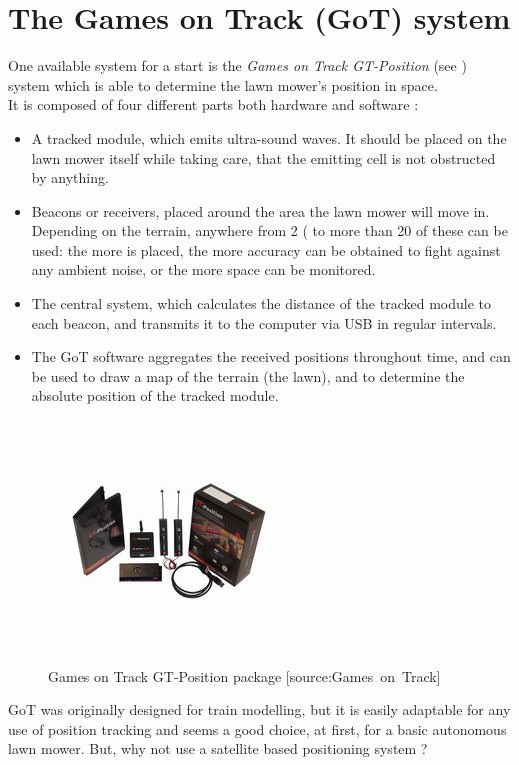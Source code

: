 \section{The Games on Track (GoT) system}
One available system for a start is the \emph{Games on Track GT-Position} (see ) system which is able to determine the lawn mower's position in space.\\
%
It is composed of four different parts both hardware and software \cite{GOTWebsitePos} :
\begin{itemize}
	\item A tracked module, which emits ultra-sound waves. It should be placed on the lawn mower itself while taking care, that the emitting cell is not obstructed by anything.
	\item Beacons or receivers, placed around the area the lawn mower will move in. Depending on the terrain, anywhere from 2 ( to more than 20 of these can be used: the more is placed, the more accuracy can be obtained to fight against any ambient noise, or the more space can be monitored.
	\item The central system, which calculates the distance of the tracked module to each beacon, and transmits it to the computer via USB in regular intervals.
	\item The GoT software aggregates the received positions throughout time, and can be used to draw a map of the terrain (the lawn), and to determine the absolute position of the tracked module.
\end{itemize}

\begin{figure}[H]
\centering
\includegraphics[scale=1.1]{figures/gotSystem.jpg} 
\caption{Games on Track GT-Position package [source:Games\ on\ Track]}
\label{fig:gotsystem}
\end{figure}
\noindent

GoT was originally designed for train modelling, but it is easily adaptable for any use of position tracking and seems a good choice, at first, for a basic autonomous lawn mower.
But, why not use a satellite based positioning system ?
